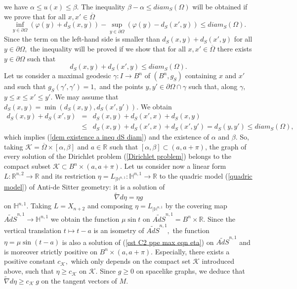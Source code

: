 \documentclass[10pt,reqno,oneside]{amsart}
\theoremstyle{definition}
\theoremstyle{remark}
\newcommand{\R}{\mathbb{R}}
\begin{document}
we have $\alpha\leq u(x)\leq\beta.$ The inequality $\beta-\alpha\leq diam_S(\Omega)$ will be obtained if we prove that for all $x,x'\in\overline{\Omega}$
$$\inf_{y\in\partial\Omega}\left(\varphi(y)+d_S(x,y)\right)-\sup_{y\in\partial\Omega}\left(\varphi(y)-d_S(x',y)\right)\leq diam_S(\Omega).$$
Since the term on the left-hand side is smaller than $d_S(x,y)+d_S(x',y)$ for all $y\in\partial\Omega,$ the inequality will be proved if we show that for all $x,x'\in\overline{\Omega}$ there exists $y\in\partial\Omega$ such that 
\begin{equation}\label{dem existence a ineq dS diam}
d_S(x,y)+d_S(x',y)\leq diam_S(\Omega).
\end{equation}
Let us consider a maximal geodesic $\gamma:I\rightarrow B^n$ of $(B^n,g_S)$ containing $x$ and $x'$ and such that $g_S(\gamma',\gamma')=1,$ and the points $y,y'\in\partial\Omega\cap\gamma$ such that, along $\gamma,$ $y\leq x\leq x'\leq y'$. We may assume that $d_S(x,y)=\min\left(d_S(x,y),d_S(x',y')\right).$ We obtain
\begin{eqnarray*}
d_S(x,y)+d_S(x',y)&=& d_S(x,y)+d_S(x',x)+d_S(x,y)\\
&\leq&d_S(x,y)+d_S(x',x)+d_S(x',y')=d_S(y,y')\leq diam_S(\Omega),
\end{eqnarray*}
which implies (\ref{dem existence a ineq dS diam}) and the existence of $\alpha$ and $\beta.$ So, taking $\mathcal{K}=\overline{\Omega}\times[\alpha,\beta]$ and $a\in\R$ such that $[\alpha,\beta]\subset (a,a+\pi)$, the graph of every solution of the Dirichlet problem (\ref{Dirichlet problem}) belongs to the compact subset  $\mathcal{K}\subset B^n\times (a,a+\pi)$. Let us consider now a linear form $L:\R^{n,2}\rightarrow\R$ and its restriction $\eta=L_{|\mathbb{H}^{n,1}}:\mathbb{H}^{n,1}\rightarrow\R$ to the quadric model (\ref{quadric model}) of Anti-de Sitter geometry: it is a solution of
\begin{equation}\label{est C2 ppe max eqn eta}
\widetilde{\nabla}d\eta=\eta g
\end{equation}
on $\mathbb{H}^{n,1}.$ Taking $L=X_{n+2}$ and composing $\eta=L_{|\mathbb{H}^{n,1}}$ by the covering map $\widetilde{AdS}^{n,1}\rightarrow\mathbb{H}^{n,1}$ we obtain the function $\mu\sin t$ on $\widetilde{AdS}^{n,1}=B^n\times\R.$ Since the vertical translation $t\mapsto t-a$ is an isometry of $\widetilde{AdS}^{n,1},$ the function $\eta=\mu\sin(t-a)$ is also a solution of (\ref{est C2 ppe max eqn eta}) on $\widetilde{AdS}^{n,1}$ and is moreover strictly positive on $B^n\times(a,a+\pi).$ Especially, there exists a positive constant $c_\mathcal{K},$ which only depends on the compact set $\mathcal{K}$ introduced above, such that $\eta\geq c_\mathcal{K}$ on $\mathcal{K}.$ Since $g\geq 0$ on spacelike graphs, we deduce that $\widetilde{\nabla}d\eta\geq c_\mathcal{K}\ g$ on the tangent vectors of $M$. 
\end{document}
